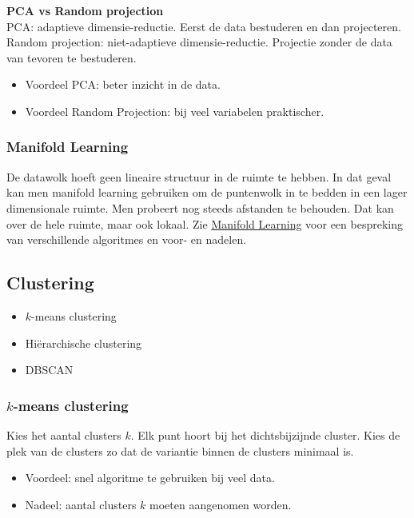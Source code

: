{\textbf{PCA vs Random projection}\\
PCA: adaptieve dimensie-reductie. Eerst de data bestuderen en dan projecteren.
Random projection: niet-adaptieve dimensie-reductie. Projectie zonder de data van tevoren te bestuderen.
\begin{itemize}
    \item Voordeel PCA: beter inzicht in de data.
    \item Voordeel Random Projection: bij veel variabelen praktischer.
\end{itemize}

\subsubsection{Manifold Learning}
De datawolk hoeft geen lineaire structuur in de ruimte te hebben. In dat geval kan men manifold learning gebruiken om de puntenwolk in te bedden in een lager dimensionale ruimte. Men probeert nog steeds afstanden te behouden. Dat kan over de hele ruimte, maar ook lokaal. Zie \href{https://scikit-learn.org/stable/modules/manifold.html}{Manifold Learning} voor een bespreking van verschillende algoritmes en voor- en nadelen.

\subsection{Clustering}
\begin{itemize}
    \item $k$-means clustering
    \item Hiërarchische clustering
    \item DBSCAN
\end{itemize}

\subsubsection{$k$-means clustering}
Kies het aantal clusters $k$. Elk punt hoort bij het dichtsbijzijnde cluster. Kies de plek van de clusters zo dat de variantie binnen de clusters minimaal is.
\begin{itemize}
    \item Voordeel: snel algoritme te gebruiken bij veel data.
    \item Nadeel: aantal clusters $k$ moeten aangenomen worden.
\end{itemize}

}
